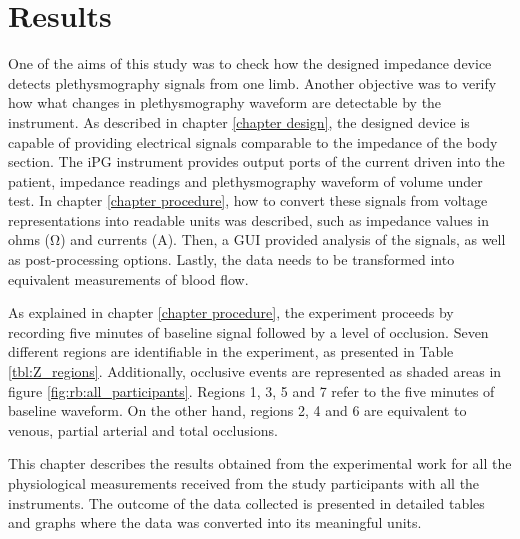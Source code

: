 
\chapter{Results}  %
\label{chapter results}

\ifpdf
\graphicspath{{Chapter6/Figs/Raster/}{Chapter6/Figs/PDF/}{Chapter6/Figs/}}
\else
\graphicspath{{Chapter6/Figs/Vector/}{Chapter6/Figs/}}
\fi

One of the aims of this study was to check how the designed impedance device detects plethysmography signals from one limb. Another objective was to verify how what changes in plethysmography waveform are detectable by the instrument. As described in chapter \ref{chapter design}, the designed device is capable of providing electrical signals comparable to the impedance of the body section. The iPG instrument provides output ports of the current driven into the patient, impedance readings and plethysmography waveform of volume under test. In chapter \ref{chapter procedure}, how to convert these signals from voltage representations into readable units was described, such as impedance values in ohms (\si{\ohm}) and currents (\si{\ampere}). Then, a GUI provided analysis of the signals, as well as post-processing options. Lastly, the data needs to be transformed into equivalent measurements of blood flow.

As explained in chapter \ref{chapter procedure}, the experiment proceeds by recording five minutes of baseline signal followed by a level of occlusion. Seven different regions are identifiable in the experiment, as presented in Table \ref{tbl:Z_regions}. Additionally, occlusive events are represented as shaded areas in figure \ref{fig:rb:all_participants}. Regions 1, 3, 5 and 7 refer to the five minutes of baseline waveform. On the other hand, regions 2, 4 and 6 are equivalent to venous, partial arterial and total occlusions.

This chapter describes the results obtained from the experimental work for all the physiological measurements received from the study participants with all the instruments. The outcome of the data collected is presented in detailed tables and graphs where the data was converted into its meaningful units. 

